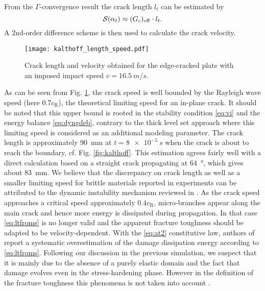 From the $\Gamma$-convergence result \cite{BourdinFrancfortMarigo:2008} the crack length $l_t$ can be estimated by
\begin{equation} \label{eq:ltfroms}
\mathcal{S}(\alpha_t)\approx(G_\mathrm{c})_\mathrm{eff}\cdot l_t.
\end{equation}
A 2nd-order difference scheme is then used to calculate the crack velocity.
\begin{figure}[htbp]
\centering
\texttt{[image: kalthoff\_length\_speed.pdf]}
\caption{Crack length and velocity obtained for the edge-cracked plate with an imposed impact speed $v=\SI{16.5}{m/s}$.} \label{fig:crack_length_speed}
\end{figure}
As can be seen from Fig. \ref{fig:crack_length_speed}, the crack speed is well bounded by the Rayleigh wave speed (here $0.7c_\mathrm{R}$), the theoretical limiting speed for an in-plane crack. It should be noted that this upper bound is rooted in the stability condition \eqref{eq:vi} and the energy balance \eqref{eq:dyngdeb}, contrary to the thick level set approach \cite{MoreauMoesPicartStainier:2015} where this limiting speed is considered as an additional modeling parameter. The crack length is approximately \SI{90}{mm} at $t=\SI{8e-5}{s}$ when the crack is about to reach the boundary, cf. Fig. \ref{fig:kalthoff}. This estimation agrees fairly well with a direct calculation based on a straight crack propagating at \SI{64}{\degree}, which gives about \SI{83}{mm}. We believe that the discrepancy on crack length as well as a smaller limiting speed for brittle materials reported in experiments can be attributed to the dynamic instability mechanism reviewed in \cite{FinebergMarder:1999}. As the crack speed approaches a critical speed approximately $0.4c_\mathrm{R}$, micro-branches appear along the main crack and hence more energy is dissipated during propagation. In that case \eqref{eq:ltfroms} is no longer valid and the apparent fracture toughness should be adapted to be velocity-dependent. With the \eqref{eq:at2} constitutive law, authors of \cite{BordenVerhooselScottHughesLandis:2012,VignolletMayBorstVerhoosel:2014} report a systematic overestimation of the damage dissipation energy according to \eqref{eq:ltfroms}. Following our discussion in the previous simulation, we suspect that it is mainly due to the absence of a purely elastic domain and the fact that damage evolves even in the stress-hardening phase. However in the definition of the fracture toughness this phenomena is not taken into account \cite{BourdinFrancfortMarigo:2008}.

